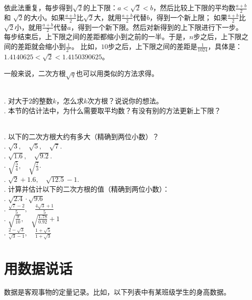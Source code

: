 \documentclass[12pt,UTF8]{ctexbook}
\begin{document}
依此法重复，每步得到$\sqrt{2}$的上下限：$a < \sqrt{2} < b$，然后比较上下限的平均数$\frac{a+b}{2}$和
$\sqrt{2}$的大小。如果$\frac{a+b}{2}$比$\sqrt{2}$大，就用$\frac{a+b}{2}$代替$b$，得到一个新上限；
如果$\frac{a+b}{2}$比$\sqrt{2}$小，就用$\frac{a+b}{2}$代替$a$，得到一个新下限。然后对新得到的上下限进行下一步。
每步结束后，上下限之间的差距都缩小到之前的一半。于是，$n$步之后，上下限之间的差距就会缩小到$\frac{1}{2^n}$。
比如，$10$步之后，上下限之间的差距是$\frac{1}{1024}$，具体是：$1.4140625 < \sqrt{2} < 1.4150390625$。

一般来说，二次方根$\sqrt{q}$也可以用类似的方法求得。
\begin{sk}\label{sk:3-2-0}
    \mbox{}\\
    . 对大于$2$的整数$k$，怎么求$k$次方根？说说你的想法。\\
    . 本节的估计法中，为什么需要取平均数？有没有别的方法更新上下限？
\end{sk}

\begin{xt}\label{xt:3-2-0}
    \mbox{}\\
    . 以下的二次方根大约有多大（精确到两位小数）？\\
    . $\sqrt{3},\quad \sqrt{5},\quad \sqrt{7}$.\\
    . $\sqrt{1.6},\quad \sqrt{9.2}$.\\
    . $\displaystyle\sqrt{\frac{5}{4}}, \quad \sqrt{\frac{7}{3}}$.\\
    . $\sqrt{2} + 1.6,\quad \sqrt{12.5} - 1$.\\
    . 计算并估计以下的二次方根的值（精确到两位小数）：\\
    . $\sqrt{2.4} \cdot \sqrt{9.6}$\\
    . $\displaystyle\frac{\sqrt{7} - 2}{5}, \quad \frac{4\sqrt{3} + 1}{5}$\\
    . $\displaystyle\sqrt{\frac{9}{10}}, \quad\sqrt{\frac{1.78}{0.92}} + 1  $\\
    . $\displaystyle\frac{2 - \sqrt{3}}{\sqrt{3} - 1}, \quad \frac{1 + \sqrt{5}}{1 + \sqrt{3}}$
\end{xt}

\chapter{用数据说话}
数据是客观事物的定量记录。比如，以下列表中有某班级学生的身高数据。
\end{document}
